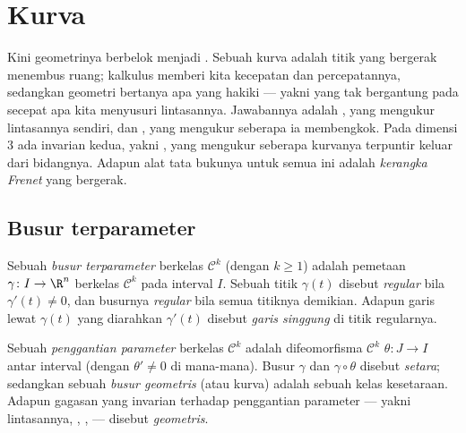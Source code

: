 \chapter{Kurva}\label{ch:b2:curves}

Kini geometrinya berbelok menjadi . Sebuah kurva adalah titik yang bergerak menembus
ruang; kalkulus memberi kita kecepatan dan percepatannya, sedangkan geometri
bertanya apa yang hakiki --- yakni yang tak bergantung pada secepat apa kita menyusuri
lintasannya. Jawabannya adalah \emph{}, yang mengukur
lintasannya sendiri, dan \emph{}, yang mengukur seberapa ia
membengkok. Pada dimensi $3$ ada invarian kedua, yakni \emph{},
yang mengukur seberapa kurvanya terpuntir keluar dari bidangnya. Adapun alat tata bukunya
untuk semua ini adalah \emph{kerangka Frenet} yang bergerak.

\section{Busur terparameter}

\begin{definition}\label{def:b2:curves:arc}
Sebuah \emph{busur terparameter} berkelas
$\mathcal{C}^k$ (dengan $k \geq 1$) adalah
pemetaan $\gamma \colon I \to \R^n$ berkelas $\mathcal{C}^k$ pada
interval $I$. Sebuah titik $\gamma(t)$ disebut \emph{regular} bila
$\gamma'(t) \neq 0$, dan busurnya \emph{regular} bila semua
titiknya demikian. Adapun garis lewat $\gamma(t)$ yang diarahkan $\gamma'(t)$
disebut \emph{garis singgung} di titik regularnya.
\end{definition}

\begin{definition}\label{def:b2:curves:reparam}
Sebuah \emph{penggantian parameter} berkelas
$\mathcal{C}^k$ adalah
difeomorfisma $\mathcal{C}^k$ $\theta \colon J \to I$ antar
interval (dengan $\theta' \neq 0$ di mana-mana). Busur $\gamma$ dan
$\gamma \circ \theta$ disebut \emph{setara}; sedangkan sebuah
\emph{busur geometris} (atau kurva) adalah sebuah kelas
kesetaraan. Adapun gagasan yang
invarian terhadap penggantian parameter --- yakni lintasannya, ,
,  --- disebut \emph{geometris}.
\end{definition}

